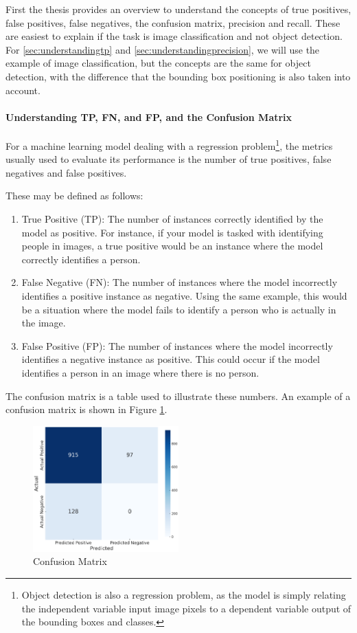 First the thesis provides an overview to understand the concepts of true positives, false positives, false negatives, the confusion matrix, precision and recall. These are easiest to explain if the task is image classification and not object detection. For \ref{sec:understandingtp} and \ref{sec:understandingprecision}, we will use the example of image classification, but the concepts are the same for object detection, with the difference that the bounding box positioning is also taken into account.

\paragraph{Understanding TP, FN, and FP, and the Confusion Matrix}
\label{sec:understandingtp}
For a machine learning model dealing with a regression problem\footnote{Object detection is also a regression problem, as the model is simply relating the independent variable input image pixels to a dependent variable output of the bounding boxes and classes.}, the metrics usually used to evaluate its performance is the number of true positives, false negatives and false positives.

These may be defined as follows:
\begin{enumerate}
    \item True Positive (TP): The number of instances correctly identified by the model as positive. For instance, if your model is tasked with identifying people in images, a true positive would be an instance where the model correctly identifies a person.
    \item False Negative (FN): The number of instances where the model incorrectly identifies a positive instance as negative. Using the same example, this would be a situation where the model fails to identify a person who is actually in the image.
    \item False Positive (FP): The number of instances where the model incorrectly identifies a negative instance as positive. This could occur if the model identifies a person in an image where there is no person.
\end{enumerate}

The confusion matrix is a table used to illustrate these numbers. An example of a confusion matrix is shown in Figure \ref{fig:confusion_matrix}.

\begin{figure}[H]
    \centering
    \includegraphics[width=0.5\textwidth]{Images/Diagrams/confusion_matrix.png}
    \caption{\centering Confusion Matrix}
    \label{fig:confusion_matrix}
\end{figure}

